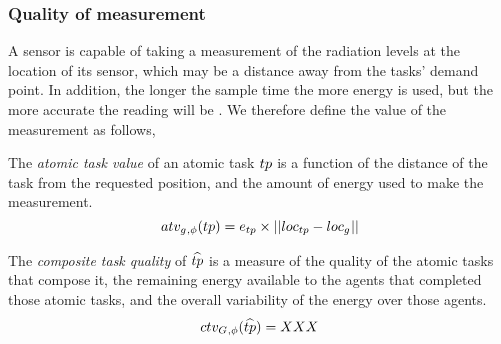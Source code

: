 \newcommand{\functionAtomicTaskQualitySignature}[2]{
	\functionSignature{atv_{\varAgent{}{}, \varTime{}{}}} {\varAtomicTask{}{}}
}
\newcommand{\functionCompositeTaskQuality}[2]{
	\functionSignature{ctv_{\setAgents{}{}, \varTime{}{}}} {\varCompositeTask{}{}}
}
\newcommand{\functionSystemUtility}[2]{u(t)}
\subsubsection*{Quality of measurement}

A sensor is capable of taking a measurement of the radiation levels at the location of its sensor, which may be a distance away from the tasks' demand point. In addition, the longer the sample time the more energy is used, but the more accurate the reading will be \cite{dummy}. We therefore define the value of the measurement as follows,

\begin{definition}
	The \textit{atomic task value} of an atomic task $\varAtomicTask{}{}$ is a function of the distance of the task from the requested position, and the amount of energy used to make the measurement.
	\begin{equation}
		\functionAtomicTaskQualitySignature{}{} = \varEnergy{\varAtomicTask{}{}}{} \times \funcSize{\funcSize{\varLocation{\varAtomicTask{}{}}{} - \varLocation{\varAgent{}{}}{}}{}}{}
	\end{equation}
\end{definition}

\begin{definition}
	The \textit{composite task quality} of $\varCompositeTask{}{}$ is a measure of the quality of the atomic tasks that compose it, the remaining energy available to the agents that completed those atomic tasks, and the overall variability of the energy over those agents. 
	\begin{equation}
		\functionCompositeTaskQuality{}{} = XXX
	\end{equation}
\end{definition}
